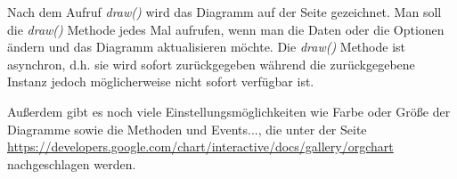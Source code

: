Nach dem Aufruf \textit{draw()} wird das Diagramm auf der Seite gezeichnet. Man soll die \textit{draw()} Methode jedes Mal aufrufen, wenn man die Daten oder die Optionen ändern und das Diagramm aktualisieren möchte. Die \textit{draw()} Methode ist asynchron, d.h. sie wird sofort zurückgegeben während die zurückgegebene Instanz jedoch möglicherweise nicht sofort verfügbar ist.


Außerdem gibt es noch viele Einstellungsmöglichkeiten wie Farbe oder Größe der Diagramme sowie die Methoden und Events..., die unter der Seite \url{https://developers.google.com/chart/interactive/docs/gallery/orgchart} nachgeschlagen werden.  


